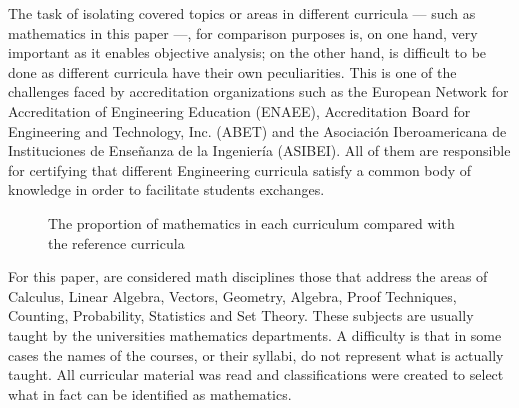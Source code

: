\documentclass[conference]{IEEEtran}
\begin{document}
	The task of isolating covered topics or areas in different curricula — such as mathematics in this paper —, for comparison purposes is, on one hand, very important as it enables objective analysis; on the other hand, is difficult to be done as different curricula have their own peculiarities. This is one of the challenges faced by accreditation organizations such as the European Network for Accreditation of Engineering Education (ENAEE), Accreditation Board for Engineering and Technology, Inc. (ABET) and the Asociación Iberoamericana de Instituciones de Enseñanza de la Ingeniería (ASIBEI). All of them are responsible for certifying that different Engineering curricula satisfy a common body of knowledge in order to facilitate students exchanges.
	

\begin{figure}[!t]
\centering
{}
\caption{The proportion of mathematics in each curriculum compared with the reference curricula}
\end{figure}

	For this paper, are considered math disciplines those that address the areas of Calculus, Linear Algebra, Vectors, Geometry, Algebra, Proof Techniques, Counting, Probability, Statistics and Set Theory. These subjects are usually taught by the universities mathematics departments. A difficulty is that in some cases the names of the courses, or their syllabi, do not represent what is actually taught. All curricular material was read and classifications were created to select what in fact can be identified as mathematics.
\end{document}
